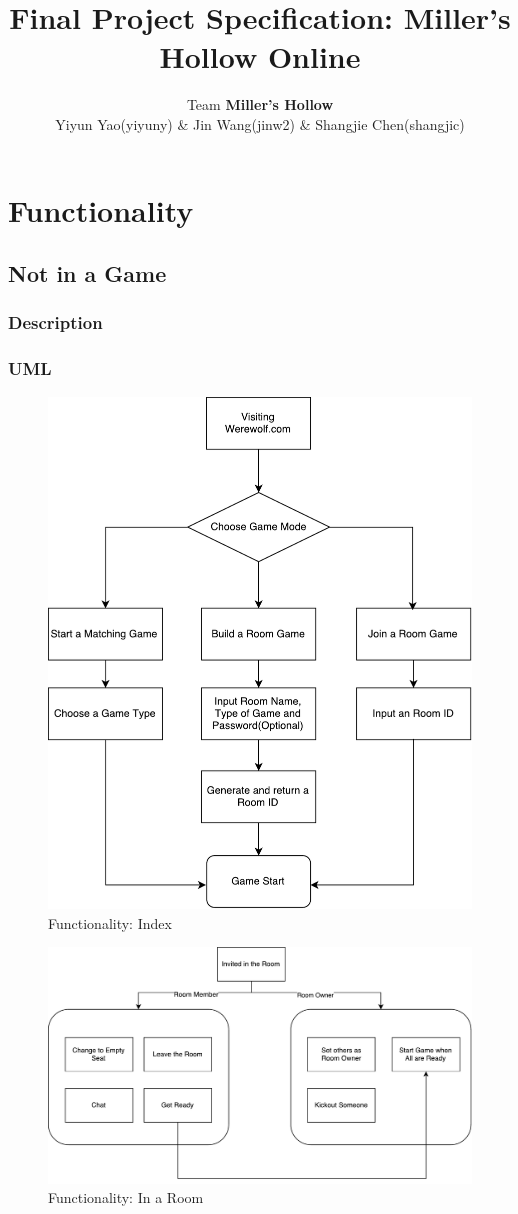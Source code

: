 \documentclass[11pt]{article}
\title{Final Project Specification: Miller's Hollow Online}
\author{Team \textbf{Miller's Hollow}
\\Yiyun Yao(yiyuny) \& Jin Wang(jinw2) \& Shangjie Chen(shangjic)}
\date{}                                           %
\begin{document}
\maketitle

\section{Functionality}
\subsection{Not in a Game}
\subsubsection{Description}
\subsubsection{UML}

\begin{figure}
\centering
\includegraphics[width=0.7\linewidth, keepaspectratio]{func-index.pdf}
\caption{Functionality: Index}
\label{fig:func-index}
\end{figure}

\begin{figure}
\centering
\includegraphics[width=0.7\linewidth, keepaspectratio]{func-inroom.pdf}
\caption{Functionality: In a Room}
\label{fig:func-inroom}
\end{figure}
\end{document}
